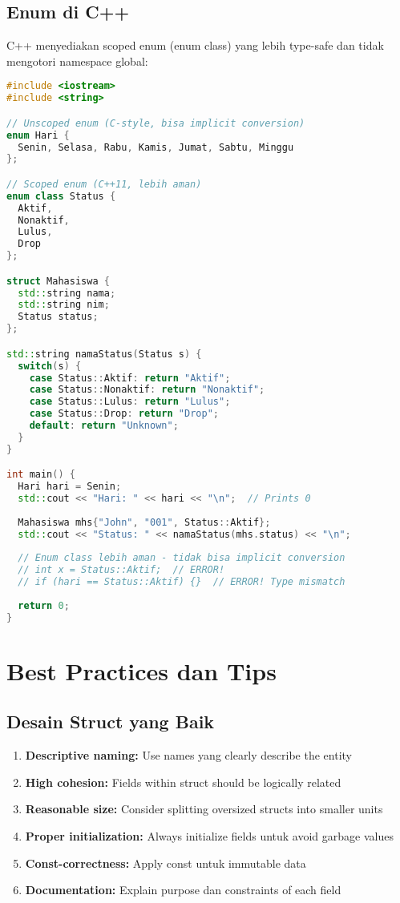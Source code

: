 \documentclass[../main.tex]{subfiles}
\begin{document}
\subsection{Enum di C++}

C++ menyediakan scoped enum (enum class) yang lebih type-safe dan tidak mengotori namespace global:

\begin{lstlisting}[language=C++, caption={Enum class di C++}]
#include <iostream>
#include <string>

// Unscoped enum (C-style, bisa implicit conversion)
enum Hari {
  Senin, Selasa, Rabu, Kamis, Jumat, Sabtu, Minggu
};

// Scoped enum (C++11, lebih aman)
enum class Status {
  Aktif,
  Nonaktif,
  Lulus,
  Drop
};

struct Mahasiswa {
  std::string nama;
  std::string nim;
  Status status;
};

std::string namaStatus(Status s) {
  switch(s) {
    case Status::Aktif: return "Aktif";
    case Status::Nonaktif: return "Nonaktif";
    case Status::Lulus: return "Lulus";
    case Status::Drop: return "Drop";
    default: return "Unknown";
  }
}

int main() {
  Hari hari = Senin;
  std::cout << "Hari: " << hari << "\n";  // Prints 0
  
  Mahasiswa mhs{"John", "001", Status::Aktif};
  std::cout << "Status: " << namaStatus(mhs.status) << "\n";
  
  // Enum class lebih aman - tidak bisa implicit conversion
  // int x = Status::Aktif;  // ERROR!
  // if (hari == Status::Aktif) {}  // ERROR! Type mismatch
  
  return 0;
}
\end{lstlisting}

\section{Best Practices dan Tips}

\subsection{Desain Struct yang Baik}

\begin{enumerate}
  \item \textbf{Descriptive naming:} Use names yang clearly describe the entity
  \item \textbf{High cohesion:} Fields within struct should be logically related
  \item \textbf{Reasonable size:} Consider splitting oversized structs into smaller units
  \item \textbf{Proper initialization:} Always initialize fields untuk avoid garbage values
  \item \textbf{Const-correctness:} Apply const untuk immutable data
  \item \textbf{Documentation:} Explain purpose dan constraints of each field
\end{enumerate}
\end{document}
